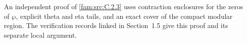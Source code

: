 \begin{remark}
\hypertarget{tag-034N}{}\label{push:section:E.4}
\label{sec:e4}
\hypertarget{tag-033L}{}\label{push:src:E.4.1}
\hypertarget{tag-033M}{}\label{push:src:E.4.2}
An independent proof of \cref{fam:src:C.2.3} uses contraction
enclosures for the zeros of $\wp$, explicit theta and eta tails,
and an exact cover of the compact modular region. The verification records linked in Section~1.5 give this proof
and its separate local argument.
\end{remark}